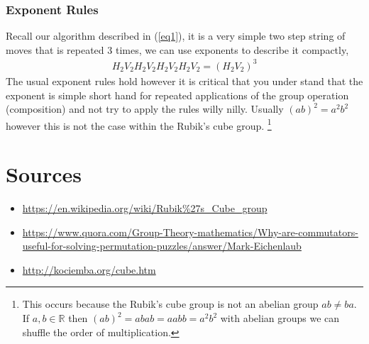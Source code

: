 \documentclass{article}
\begin{document}
\subsubsection{Exponent Rules}
Recall our algorithm described in (\ref{eq1}), it is a very simple two step string of moves that is repeated 3 times, we can use exponents to describe it compactly,
\begin{align}
    H_{2}V_{2}H_{2}V_{2}H_{2}V_{2}H_{2}V_{2}=(H_{2}V_{2})^{3}
\end{align}
The usual exponent rules hold however it is critical that you under stand that the exponent is simple short hand for repeated applications of the group operation (composition) and not try to apply the rules willy nilly.
Usually $(ab)^2=a^2b^2$ however this is not the case within the Rubik's cube group.
\footnote{This occurs because the Rubik's cube group is not an abelian group $ab\neq ba$. If $a,b\in \mathbb{R}$ then $(ab)^2=abab=aabb=a^2b^2$ with abelian groups we can shuffle the order of multiplication.}
\section{Sources}
\begin{itemize}
    \item \url{https://en.wikipedia.org/wiki/Rubik\%27s\_Cube\_group}
    \item \url{https://www.quora.com/Group-Theory-mathematics/Why-are-commutators-useful-for-solving-permutation-puzzles/answer/Mark-Eichenlaub}
    \item \url{http://kociemba.org/cube.htm}
\end{itemize}
\end{document}
